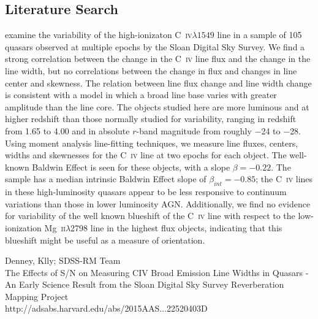 \documentclass[a4paper,fleqn,usenatbib]{mnras}
\begin{document}
\subsection{Literature Search}
\citet{Wilhite2006} examine the variability of the high-ionizaton
C~\textsc{iv}$\lambda{1549}$ line in a sample of 105 quasars observed
at multiple epochs by the Sloan Digital Sky Survey.  We find a strong
correlation between the change in the C~\textsc{iv} line flux and the
change in the line width, but no correlations between the change in
flux and changes in line center and skewness.  The relation between
line flux change and line width change is consistent with a model in
which a broad line base varies with greater amplitude than the line
core. The objects studied here are more luminous and at higher
redshift than those normally studied for variability, ranging in
redshift from 1.65 to 4.00 and in absolute $r$-band magnitude from
roughly $-$24 to $-$28.  Using moment analysis line-fitting
techniques, we measure line fluxes, centers, widths and skewnesses for
the C~\textsc{iv} line at two epochs for each object.  The well-known
Baldwin Effect is seen for these objects, with a slope $\beta =
-0.22$.  The sample has a median intrinsic Baldwin Effect slope of
$\beta_{int} = -0.85$; the C~\textsc{iv} lines in these
high-luminosity quasars appear to be less responsive to continuum
variations than those in lower luminosity AGN.  Additionally, we find
no evidence for variability of the well known blueshift of the
C~\textsc{iv} line with respect to the low-ionization
Mg~\textsc{ii}$\lambda$2798 line in the highest flux objects,
indicating that this blueshift might be useful as a measure of
orientation.





Denney, Klly; SDSS-RM Team \\
The Effects of S/N on Measuring CIV Broad Emission Line Widths in Quasars - An Early Science Result from the Sloan Digital Sky Survey Reverberation Mapping Project\\
http://adsabs.harvard.edu/abs/2015AAS...22520403D\\
\end{document}
